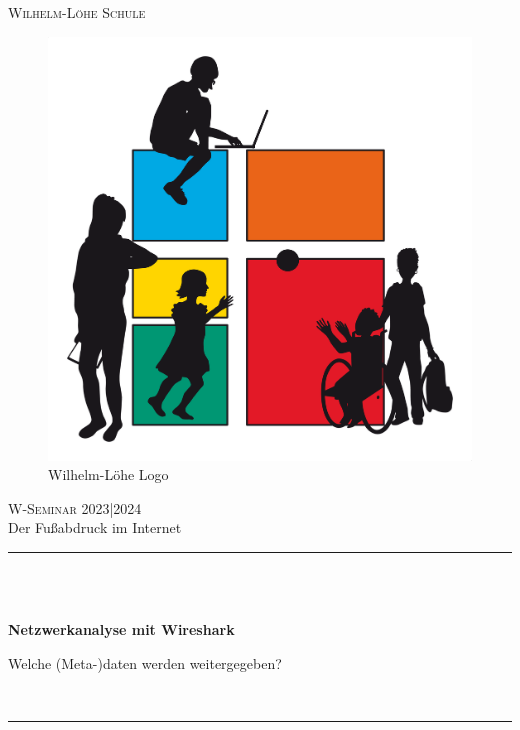 \newcommand{\HRule}{\rule{\linewidth}{0.4mm}} %


\begin{center}


\textsc{\LARGE Wilhelm-Löhe Schule}\\[1cm] %

\begin{figure}[h]
	\centering
	\includegraphics[scale=0.06]{Bilder/WLS_logo}
	\caption{Wilhelm-Löhe Logo}
	\label{fig:figure0}
\end{figure}
\textsc{\Large W-Seminar 2023|2024}\\[0.5cm] %
\large Der Fußabdruck im Internet\\[0.5cm] %


\HRule \\ \

{ \Large \bfseries Netzwerkanalyse mit Wireshark 
	
	
	\large  \mdseries Welche (Meta-)daten werden weitergegeben?}\\ %
\HRule \\[1cm]


\end{center}
